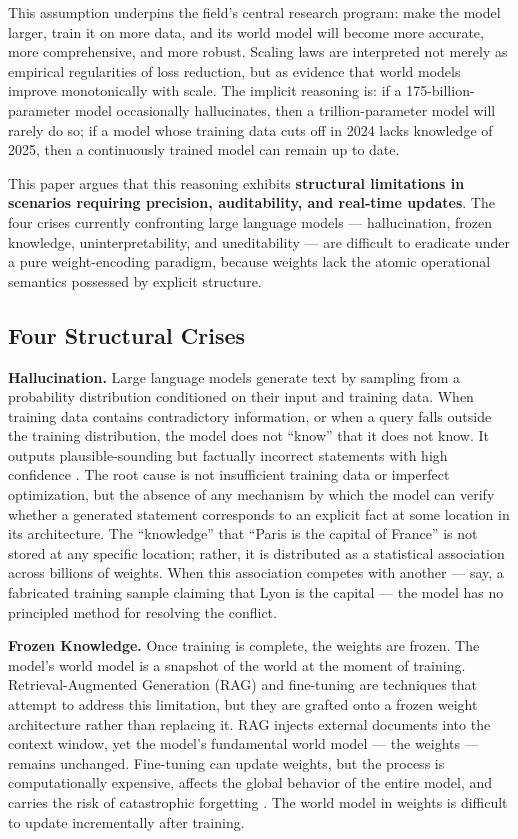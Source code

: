 \documentclass[11pt,a4paper]{article}
\begin{document}
This assumption underpins the field's central research program: make the
model larger, train it on more data, and its world model will become
more accurate, more comprehensive, and more robust. Scaling laws
\cite{kaplan2020,hoffmann2022} are interpreted not merely as empirical regularities of loss
reduction, but as evidence that world models improve monotonically with
scale. The implicit reasoning is: if a 175-billion-parameter model
occasionally hallucinates, then a trillion-parameter model will rarely
do so; if a model whose training data cuts off in 2024 lacks knowledge
of 2025, then a continuously trained model can remain up to date.

This paper argues that this reasoning exhibits \textbf{structural
limitations in scenarios requiring precision, auditability, and
real-time updates}. The four crises currently confronting large language
models --- hallucination, frozen knowledge, uninterpretability, and
uneditability --- are difficult to eradicate under a pure
weight-encoding paradigm, because weights lack the atomic operational
semantics possessed by explicit structure.

\subsection{Four Structural Crises}\label{four-structural-crises}

\textbf{Hallucination.} Large language models generate text by sampling
from a probability distribution conditioned on their input and training
data. When training data contains contradictory information, or when a
query falls outside the training distribution, the model does not
``know'' that it does not know. It outputs plausible-sounding but
factually incorrect statements with high confidence \cite{ji2023}. The root
cause is not insufficient training data or imperfect optimization, but
the absence of any mechanism by which the model can verify whether a
generated statement corresponds to an explicit fact at some location in
its architecture. The ``knowledge'' that ``Paris is the capital of
France'' is not stored at any specific location; rather, it is
distributed as a statistical association across billions of weights.
When this association competes with another --- say, a fabricated
training sample claiming that Lyon is the capital --- the model has no
principled method for resolving the conflict.

\textbf{Frozen Knowledge.} Once training is complete, the weights are
frozen. The model's world model is a snapshot of the world at the moment
of training. Retrieval-Augmented Generation (RAG) \cite{lewis2020} and
fine-tuning \cite{hu2022} are techniques that attempt to address this
limitation, but they are grafted onto a frozen weight architecture
rather than replacing it. RAG injects external documents into the
context window, yet the model's fundamental world model --- the weights
--- remains unchanged. Fine-tuning can update weights, but the process
is computationally expensive, affects the global behavior of the entire
model, and carries the risk of catastrophic forgetting \cite{mccloskey1989}. The
world model in weights is difficult to update incrementally after
training.
\end{document}
